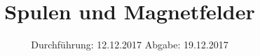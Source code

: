 

\subject{Versuch 308}
\title{Spulen und Magnetfelder}
\date{
  Durchführung: 12.12.2017
  \hspace{3em}
  Abgabe: 19.12.2017
}



\maketitle
\thispagestyle{empty}
\tableofcontents
\newpage



\newpage



\newpage
\printbibliography{}


